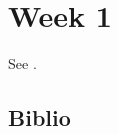 \documentclass[11pt]{book}
\begin{document}
    
    \tableofcontents
    \chapter{Week 1}
    
    See \cite{Bauer_2008}.

    \newpage
    \section*{Biblio}
    
    
    \printindex
\end{document}
